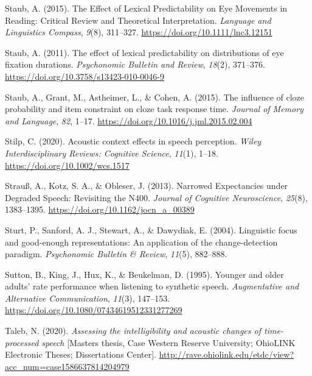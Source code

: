 \documentclass[a4paper, nobind]{templates/ociamthesis}
\newlength{\cslhangindent}
\newenvironment{CSLReferences}[2] %
 {%
  \setlength{\parindent}{0pt}
  \ifodd #1
  \let\oldpar\par
  \def\par{\hangindent=\cslhangindent\oldpar}
  \fi
  \setlength{\parskip}{1mm}
  \setlength{\baselineskip}{6mm}
 }%
 {}
\begin{document}
\begin{CSLReferences}{1}{0}
\leavevmode{}%
Staub, A. (2015). The Effect of Lexical Predictability on Eye Movements in Reading: Critical Review and Theoretical Interpretation. \emph{Language and Linguistics Compass}, \emph{9}(8), 311--327. \url{https://doi.org/10.1111/lnc3.12151}

\leavevmode{}%
Staub, A. (2011). {The effect of lexical predictability on distributions of eye fixation durations}. \emph{Psychonomic Bulletin and Review}, \emph{18}(2), 371--376. \url{https://doi.org/10.3758/s13423-010-0046-9}

\leavevmode{}%
Staub, A., Grant, M., Astheimer, L., \& Cohen, A. (2015). {The influence of cloze probability and item constraint on cloze task response time}. \emph{Journal of Memory and Language}, \emph{82}, 1--17. \url{https://doi.org/10.1016/j.jml.2015.02.004}

\leavevmode{}%
Stilp, C. (2020). {Acoustic context effects in speech perception}. \emph{Wiley Interdisciplinary Reviews: Cognitive Science}, \emph{11}(1), 1--18. \url{https://doi.org/10.1002/wcs.1517}

\leavevmode{}%
Strauß, A., Kotz, S. A., \& Obleser, J. (2013). Narrowed Expectancies under Degraded Speech: Revisiting the N400. \emph{Journal of Cognitive Neuroscience}, \emph{25}(8), 1383--1395. \url{https://doi.org/10.1162/jocn_a_00389}

\leavevmode{}%
Sturt, P., Sanford, A. J., Stewart, A., \& Dawydiak, E. (2004). Linguistic focus and good-enough representations: An application of the change-detection paradigm. \emph{Psychonomic Bulletin \& Review}, \emph{11}(5), 882--888.

\leavevmode{}%
Sutton, B., King, J., Hux, K., \& Beukelman, D. (1995). Younger and older adults' rate performance when listening to synthetic speech. \emph{Augmentative and Alternative Communication}, \emph{11}(3), 147--153. \url{https://doi.org/10.1080/07434619512331277269}

\leavevmode{}%
Taleb, N. (2020). \emph{Assessing the intelligibility and acoustic changes of time-processed speech} {[}Masters thesis, Case Western Reserve University; OhioLINK Electronic Theses; Dissertations Center{]}. \url{http://rave.ohiolink.edu/etdc/view?acc_num=case1586637814204979}


\end{CSLReferences}
\end{document}
